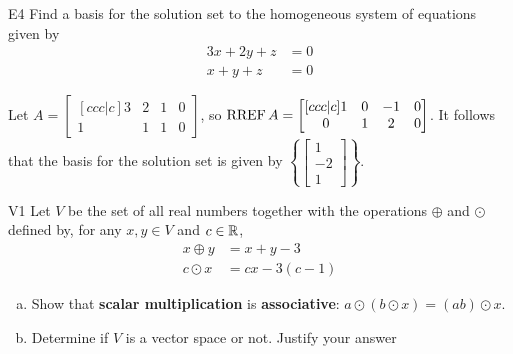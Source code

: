 \documentclass{sbgLAsemi}
\begin{document}
\begin{problem}{E4}
Find a basis for the solution set to the homogeneous system of equations
given by
\begin{align*}
3x+2y+z &= 0 \\
x+y+z &= 0
\end{align*}
\end{problem}
\begin{solution}
Let \(A =
  \begin{bmatrix}[ccc|c]
    3 & 2 & 1 & 0 \\
    1 & 1 & 1 & 0
  \end{bmatrix}
\), so \(\operatorname{RREF} A =
  \begin{bmatrix}[ccc|c]
    1 & 0 & -1 & 0 \\
    0 & 1 & 2 & 0
  \end{bmatrix}
\).
It follows that the basis for the solution set is given by \(\left\{
  \begin{bmatrix}
    1 \\
    -2 \\
    1
  \end{bmatrix}
\right\}\).
\end{solution}

\begin{problem}{V1}
Let $V$ be the  set of all real numbers together with the operations $\oplus$ and $\odot$ defined by, for any $x,y \in V$ and $c \in \mathbb{R}$,
\begin{align*}
x\oplus y  &= x+y-3 \\
c \odot x &= cx-3(c-1)
\end{align*}
\begin{enumerate}[(a)]
\item Show that \textbf{scalar multiplication} is
      \textbf{associative}: \(a\odot(b\odot x)=(ab)\odot x\).
\item Determine if $V$ is a vector space or not.  Justify your answer
\end{enumerate}
\end{problem}
\end{document}
